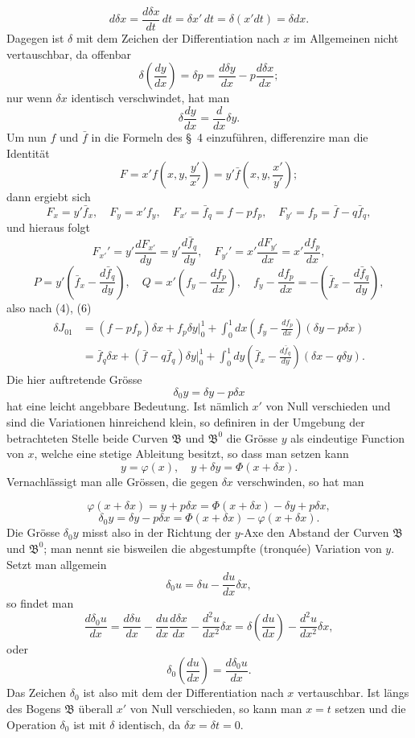 \documentclass[11pt,a4paper,leqno]{article}
\begin{document}
\[
d\delta x=\frac{d\delta x}{dt}\,dt=\delta x'\,dt=\delta(x'dt)=\delta dx.
\]
Dagegen ist \(\delta\) mit dem Zeichen der Differentiation nach \(x\) im Allgemeinen nicht vertauschbar, da offenbar
\[
\delta\left(\frac{dy}{dx}\right)=\delta p=\frac{d\delta y}{dx}-p\frac{d\delta x}{dx};
\]
nur wenn \(\delta x\) identisch verschwindet, hat man
\[
\delta\frac{dy}{dx}=\frac{d}{dx}\delta y.
\]
Um nun \(f\) und \(\bar f\) in die Formeln des \S~4 einzuführen, differenzire man die Identität
\[
F=x'f\left(x,y,\frac{y'}{x'}\right)=y'\bar f\left(x,y,\frac{x'}{y'}\right);
\]
dann ergiebt sich
\[
F_x=y'\bar f_x,\quad F_y=x'f_y,\quad F_{x'}=\bar f_q=f-pf_p,\quad F_{y'}=f_p=\bar f-q\bar f_q,
\]
und hieraus folgt
\[
F_{x'}'=y'\frac{dF_{x'}}{dy}=y'\frac{d\bar f_q}{dy},\quad
F_{y'}'=x'\frac{dF_{y'}}{dx}=x'\frac{df_p}{dx},
\]
\[
P=y'\left(\bar f_x-\frac{d\bar f_q}{dy}\right),\quad
Q=x'\left(f_y-\frac{df_p}{dx}\right),\quad
f_y-\frac{df_p}{dx}=-\left(\bar f_x-\frac{d\bar f_q}{dy}\right),
\]
also nach (4), (6)
\[
\begin{aligned}
\delta J_{01}&=(f-pf_p)\delta x+f_p\delta y\bigg|_0^1+\int_0^1dx\left(f_y-\frac{df_p}{dx}\right)(\delta y-p\delta x)\\
&=\bar f_q\delta x+(\bar f-q\bar f_q)\delta y\bigg|_0^1+\int_0^1dy\left(\bar f_x-\frac{d\bar f_q}{dy}\right)(\delta x-q\delta y).
\end{aligned}
\]
Die hier auftretende Grösse
\[
\delta_0y=\delta y-p\delta x
\]
hat eine leicht angebbare Bedeutung. Ist nämlich \(x'\) von Null verschieden und sind die Variationen hinreichend klein, so definiren in der Umgebung der betrachteten Stelle beide Curven \(\mathfrak B\) und \(\mathfrak B^0\) die Grösse \(y\) als eindeutige Function von \(x\), welche eine stetige Ableitung besitzt, so dass man setzen kann
\[
y=\varphi(x),\quad y+\delta y=\Phi(x+\delta x).
\]
Vernachlässigt man alle Grössen, die gegen \(\delta x\) verschwinden, so hat man

\[
\varphi(x+\delta x)=y+p\delta x=\Phi(x+\delta x)-\delta y+p\delta x,
\]
\[
\delta_0y=\delta y-p\delta x=\Phi(x+\delta x)-\varphi(x+\delta x).
\]
Die Grösse \(\delta_0y\) misst also in der Richtung der \(y\)-Axe den Abstand der Curven \(\mathfrak B\) und \(\mathfrak B^0\); man nennt sie bisweilen die abgestumpfte (tronquée) Variation von \(y\). Setzt man allgemein
\[
\delta_0u=\delta u-\frac{du}{dx}\delta x,
\]
so findet man
\[
\frac{d\delta_0u}{dx}=\frac{d\delta u}{dx}-\frac{du}{dx}\frac{d\delta x}{dx}-\frac{d^2u}{dx^2}\delta x
=\delta\left(\frac{du}{dx}\right)-\frac{d^2u}{dx^2}\delta x,
\]
oder
\[
\delta_0\left(\frac{du}{dx}\right)=\frac{d\delta_0u}{dx}.
\]
Das Zeichen \(\delta_0\) ist also mit dem der Differentiation nach \(x\) vertauschbar. Ist längs des Bogens \(\mathfrak B\) überall \(x'\) von Null verschieden, so kann man \(x=t\) setzen und die Operation \(\delta_0\) ist mit \(\delta\) identisch, da \(\delta x=\delta t=0\).
\end{document}
